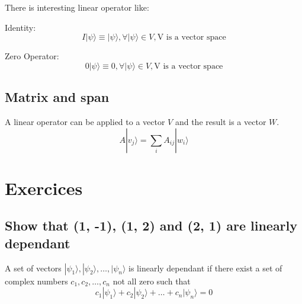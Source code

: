 \documentclass{article}
\begin{document}
There is interesting linear operator like:

Identity:
\begin{equation}
    I|\psi\rangle \equiv |\psi\rangle, \forall |\psi\rangle \in V, \text{V is a vector space}
\end{equation}

Zero Operator:
\begin{equation}
    0|\psi\rangle \equiv 0, \forall |\psi\rangle \in V, \text{V is a vector space}
\end{equation}

\subsection{Matrix and span}

A linear operator can be applied to a vector $V$ and the result is a vector $W$.
\begin{equation}
    A|v_j\rangle = \sum_{i}^{} A_{ij}|w_i\rangle
\end{equation}

\section{Exercices}

\subsection{Show that (1, -1), (1, 2) and (2, 1) are linearly dependant}

A set of vectors $|\psi_1\rangle, |\psi_2\rangle, \dots, |\psi_n\rangle$ is linearly dependant if there exist a set of complex numbers $c_1, c_2, \dots, c_n$ not all zero such that
\begin{equation}
    c_1|\psi_1\rangle + c_2|\psi_2\rangle + \dots + c_n|\psi_n\rangle = 0
\end{equation}
\end{document}
